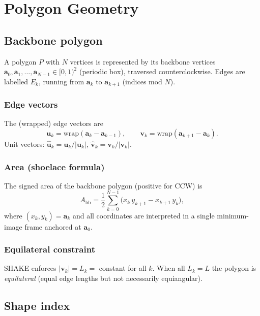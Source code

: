 \documentclass[12pt]{article}
\newcommand{\uvec}{\hat{\mathbf{u}}}
\newcommand{\vvec}{\hat{\mathbf{v}}}
\begin{document}
\section{Polygon Geometry}

\subsection{Backbone polygon}

A polygon $P$ with $N$ vertices is represented by its backbone vertices
$\mathbf{a}_0, \mathbf{a}_1, \ldots, \mathbf{a}_{N-1} \in [0,1)^2$ (periodic box),
traversed counterclockwise.  Edges are labelled $E_k$, running from $\mathbf{a}_k$
to $\mathbf{a}_{k+1}$ (indices mod $N$).

\subsubsection{Edge vectors}

The (wrapped) edge vectors are
\[
  \mathbf{u}_k = \mathrm{wrap}(\mathbf{a}_k - \mathbf{a}_{k-1}), \qquad
  \mathbf{v}_k = \mathrm{wrap}(\mathbf{a}_{k+1} - \mathbf{a}_k).
\]
Unit vectors: $\uvec_k = \mathbf{u}_k / |\mathbf{u}_k|$, \;
$\vvec_k = \mathbf{v}_k / |\mathbf{v}_k|$.

\subsubsection{Area (shoelace formula)}

The signed area of the backbone polygon (positive for CCW) is
\[
  A_{\mathrm{bb}} = \frac{1}{2} \sum_{k=0}^{N-1}
      \bigl(x_k\, y_{k+1} - x_{k+1}\, y_k\bigr),
\]
where $(x_k, y_k) = \mathbf{a}_k$ and all coordinates are interpreted in a
single minimum-image frame anchored at $\mathbf{a}_0$.

\subsubsection{Equilateral constraint}

SHAKE enforces $|\mathbf{v}_k| = L_k = $ constant for all $k$.  When all $L_k = L$
the polygon is \emph{equilateral} (equal edge lengths but not necessarily equiangular).

\subsection{Shape index}
\end{document}
